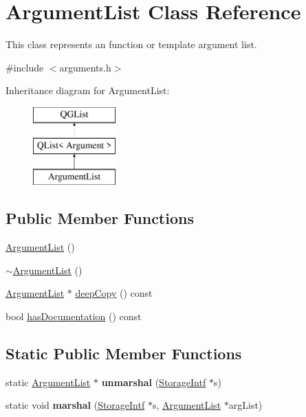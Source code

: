 \hypertarget{class_argument_list}{}\section{Argument\+List Class Reference}
\label{class_argument_list}


This class represents an function or template argument list.  




{\ttfamily \#include $<$arguments.\+h$>$}

Inheritance diagram for Argument\+List\+:\begin{figure}[H]
\begin{center}
\leavevmode
\includegraphics[height=3.000000cm]{class_argument_list}
\end{center}
\end{figure}
\subsection*{Public Member Functions}
\begin{DoxyCompactItemize}
\item 
\mbox{\hyperlink{class_argument_list_a2f46f024604fbd06eb4f2d18f97f74c0}{Argument\+List}} ()
\item 
\mbox{\hyperlink{class_argument_list_a208ee05222465738505facb0b24e0380}{$\sim$\+Argument\+List}} ()
\item 
\mbox{\hyperlink{class_argument_list}{Argument\+List}} $\ast$ \mbox{\hyperlink{class_argument_list_a9c87ea86c299ce39b3818548e38f6cad}{deep\+Copy}} () const
\item 
bool \mbox{\hyperlink{class_argument_list_a3d2726240dff68120149845452e1d1ec}{has\+Documentation}} () const
\end{DoxyCompactItemize}
\subsection*{Static Public Member Functions}
\begin{DoxyCompactItemize}
\item 
\mbox{\label{class_argument_list_afa737f8c786a4ea7e3e14d7baf063aea}} 
static \mbox{\hyperlink{class_argument_list}{Argument\+List}} $\ast$ {\bfseries unmarshal} (\mbox{\hyperlink{class_storage_intf}{Storage\+Intf}} $\ast$s)
\item 
\mbox{\label{class_argument_list_ab46945cd744a8c28a8c30c40849d32d1}} 
static void {\bfseries marshal} (\mbox{\hyperlink{class_storage_intf}{Storage\+Intf}} $\ast$s, \mbox{\hyperlink{class_argument_list}{Argument\+List}} $\ast$arg\+List)
\end{DoxyCompactItemize}

